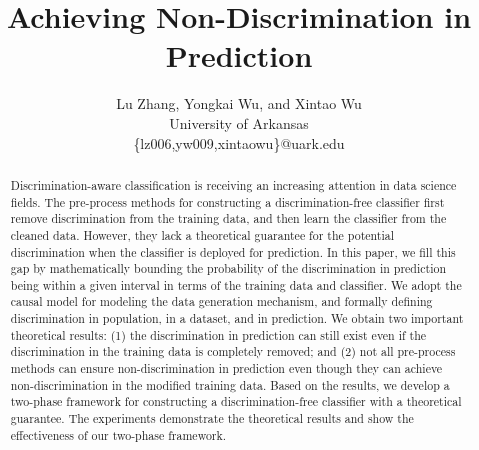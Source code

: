 \documentclass{article}
\title{Achieving Non-Discrimination in Prediction}
\author{Lu Zhang, Yongkai Wu, and Xintao Wu\\
University of Arkansas\\
\{lz006,yw009,xintaowu\}@uark.edu}
\begin{document}
\maketitle

\begin{abstract}
Discrimination-aware classification is receiving an increasing attention in data science fields. The pre-process methods for constructing a discrimination-free classifier first remove discrimination from the training data, and then learn the classifier from the cleaned data. However, they lack a theoretical guarantee for the potential discrimination when the classifier is deployed for prediction. In this paper, we fill this gap by mathematically bounding the probability of the discrimination in prediction being within a given interval in terms of the training data and classifier. We adopt the causal model for modeling the data generation mechanism, and formally defining discrimination in population, in a dataset, and in prediction. We obtain two important theoretical results: (1) the discrimination in prediction can still exist even if the discrimination in the training data is completely removed; and (2) not all pre-process methods can ensure non-discrimination in prediction even though they can achieve non-discrimination in the modified training data. %
Based on the results, we develop a two-phase framework for constructing a discrimination-free classifier with a theoretical guarantee. The experiments demonstrate the theoretical results and show the effectiveness of our two-phase framework.
\end{abstract}
\end{document}
